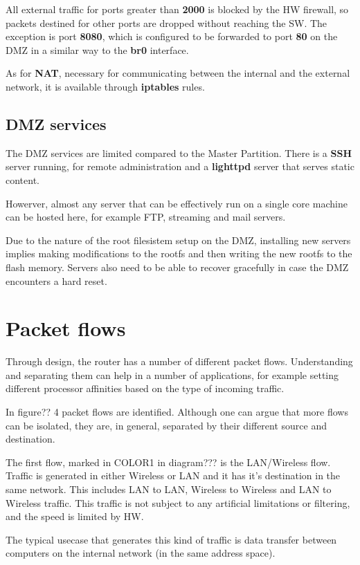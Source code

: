 All external traffic for ports greater than \textbf{2000} is blocked by the HW firewall,
so packets destined for other ports are dropped without reaching the SW.
The exception is port \textbf{8080}, which is configured to be forwarded 
to port \textbf{80} on the DMZ in a similar way to the \textbf{br0} interface.

As for \textbf{NAT}, necessary for communicating between the internal and
the external network, it is available through \textbf{iptables} rules.

\subsection{DMZ services}
The DMZ services are limited compared to the Master Partition.
There is a \textbf{SSH} server running, for remote administration and
a \textbf{lighttpd} server that serves static content.

Howerver, almost any server that can be effectively run on a single core
machine can be hosted here, for example FTP, streaming and mail servers.

Due to the nature of the root filesistem setup on the DMZ, installing new
servers implies making modifications to the rootfs and then writing the
new rootfs to the flash memory. Servers also need to be able to recover
gracefully in case the DMZ encounters a hard reset.


\section{Packet flows}
\label{sec:flows}

Through design, the router has a number of different packet flows.
Understanding and separating them can help in a number of applications,
for example setting different processor affinities based on the 
type of incoming traffic.

In figure?? 4 packet flows are identified. Although one can argue that more
flows can be isolated, they are, in general, separated by their different
source and destination.

The first flow, marked in COLOR1 in diagram??? is the LAN/Wireless flow.
Traffic is generated in either Wireless or LAN and it has it's destination
in the same network. This includes LAN to LAN, Wireless to Wireless and 
LAN to Wireless traffic. This traffic is not subject to any artificial
limitations or filtering, and the speed is limited by HW.

The typical usecase that generates this kind of traffic is data transfer
between computers on the internal network (in the same address space).

